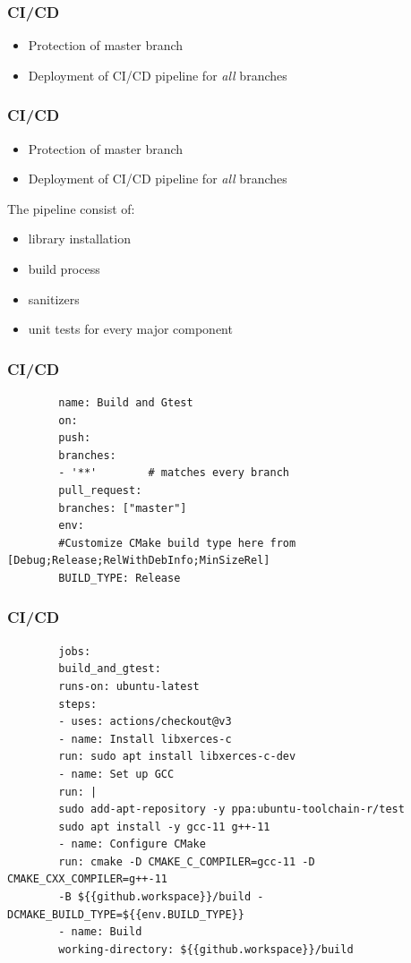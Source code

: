 \begin{frame}
	\frametitle{CI/CD}
	\large
	\begin{itemize}
		\item<1-> Protection of master branch
		\item<2-> Deployment of CI/CD pipeline for \textit{all} branches 
	\end{itemize}
	
\end{frame}


\begin{frame}
	\frametitle{CI/CD}
	\large
	\begin{itemize}
		\item Protection of master branch
		\item Deployment of CI/CD pipeline for \textit{all} branches 
	\end{itemize}
	\Large
	The pipeline consist of:
	\large
	\begin{itemize}
		\item<1-> library installation
		\item<2-> build process
		\item<3-> sanitizers
		\item<4-> unit tests for every major component
	\end{itemize}
\end{frame}

\begin{frame}[fragile]
	\frametitle{CI/CD}
	\begin{lstlisting}
		name: Build and Gtest
		on:
		push:
		branches:
		- '**'        # matches every branch
		pull_request:
		branches: ["master"]
		env:
		#Customize CMake build type here from [Debug;Release;RelWithDebInfo;MinSizeRel]
		BUILD_TYPE: Release	
	\end{lstlisting}
\end{frame}

\begin{frame}[fragile]
	\frametitle{CI/CD}
	
	\begin{lstlisting}
		jobs:
		build_and_gtest:
		runs-on: ubuntu-latest
		steps:
		- uses: actions/checkout@v3
		- name: Install libxerces-c
		run: sudo apt install libxerces-c-dev
		- name: Set up GCC
		run: |
		sudo add-apt-repository -y ppa:ubuntu-toolchain-r/test
		sudo apt install -y gcc-11 g++-11
		- name: Configure CMake
		run: cmake -D CMAKE_C_COMPILER=gcc-11 -D CMAKE_CXX_COMPILER=g++-11 
		-B ${{github.workspace}}/build -DCMAKE_BUILD_TYPE=${{env.BUILD_TYPE}}
		- name: Build
		working-directory: ${{github.workspace}}/build
	\end{lstlisting}
\end{frame}

